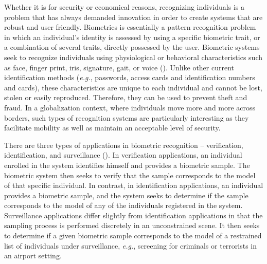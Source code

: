 Whether it is for security or economical reasons, recognizing individuals is a problem that has always demanded innovation in order to create systems that are robust and user friendly.
Biometrics is essentially a pattern recognition problem in which an individual's identity is assessed by using a specific biometric trait, or a combination of several traits, directly possessed by the user.
Biometric systems seek to recognize individuals using physiological or behavioral characteristics such as face, finger print, iris, signature, gait, or voice (\cite{jain06}).
Unlike other current identification methods (\emph{e.g.}, passwords, access cards and identification numbers and cards), these characteristics are unique to each individual and cannot be lost, stolen or easily reproduced.
Therefore, they can be used to prevent theft and fraud.
In a globalization context, where individuals move more and more across borders, such types of recognition systems are particularly interesting as they facilitate mobility as well as maintain an acceptable level of security.

There are three types of applications in biometric recognition -- verification, identification, and surveillance (\cite{jain06}).
In verification applications, an individual enrolled in the system identifies himself and provides a biometric sample.
The biometric system then seeks to verify that the sample corresponds to the model of that specific individual.
In contrast, in identification applications, an individual provides a biometric sample, and the system seeks to determine if the sample corresponds to the model of any of the individuals registered in the system.
Surveillance applications differ slightly from identification applications in that the sampling process is performed discretely in an unconstrained scene.
It then seeks to determine if a given biometric sample corresponds to the model of a restrained list of individuals under surveillance, \emph{e.g.}, screening for criminals or terrorists in an airport setting.

